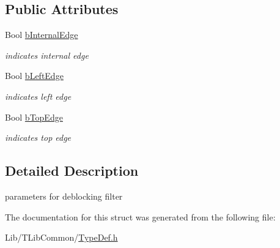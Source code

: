 \subsection*{Public Attributes}
\begin{DoxyCompactItemize}
\item 
\mbox{\label{struct___l_f_c_u_param_a7f4f9423140f9367ecd26c7ce9ae28d4}} 
Bool \hyperlink{struct___l_f_c_u_param_a7f4f9423140f9367ecd26c7ce9ae28d4}{b\+Internal\+Edge}
\begin{DoxyCompactList}\small\item\em indicates internal edge \end{DoxyCompactList}\item 
\mbox{\label{struct___l_f_c_u_param_a519ab1d44cf9e8ad89a1bb7709f5a514}} 
Bool \hyperlink{struct___l_f_c_u_param_a519ab1d44cf9e8ad89a1bb7709f5a514}{b\+Left\+Edge}
\begin{DoxyCompactList}\small\item\em indicates left edge \end{DoxyCompactList}\item 
\mbox{\label{struct___l_f_c_u_param_a106cd6313ee566a3c29e973762692db4}} 
Bool \hyperlink{struct___l_f_c_u_param_a106cd6313ee566a3c29e973762692db4}{b\+Top\+Edge}
\begin{DoxyCompactList}\small\item\em indicates top edge \end{DoxyCompactList}\end{DoxyCompactItemize}


\subsection{Detailed Description}
parameters for deblocking filter 

The documentation for this struct was generated from the following file\+:\begin{DoxyCompactItemize}
\item 
Lib/\+T\+Lib\+Common/\hyperlink{_type_def_8h}{Type\+Def.\+h}\end{DoxyCompactItemize}
